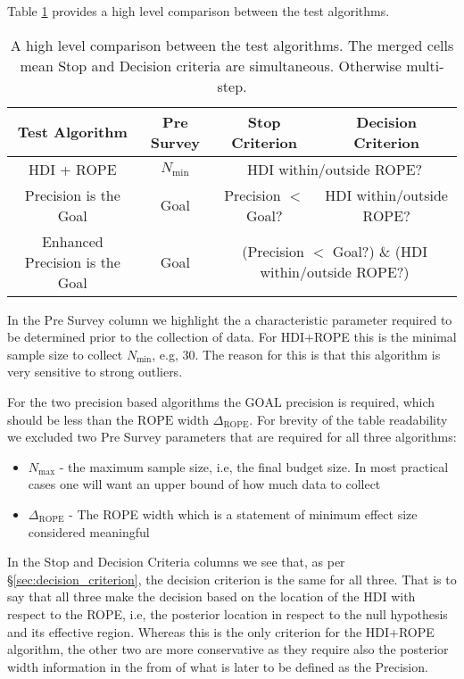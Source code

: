 Table \ref{tab:table1} provides a high level comparison between the test algorithms.


\begin{table}[h!]\label{tab:table1}
    \begin{center}
      \begin{tabular}{c|c|c|c}
        \textbf{Test Algorithm } & \textbf{Pre Survey} & \textbf{Stop Criterion} &  \textbf{Decision Criterion}\\
        \hline
        HDI + ROPE & $N_\mathrm{min}$  & \multicolumn{2}{c}{\multirow{1}{*}{HDI within/outside ROPE?}}  \\
        Precision is the Goal & Goal & Precision $<$ Goal? & HDI within/outside ROPE? \\
        Enhanced Precision is the Goal & Goal& \multicolumn{2}{c}{\multirow{1}{*}{(Precision $<$ Goal?) \& (HDI within/outside ROPE?)}}  \\
      \end{tabular}
      \caption{A high level comparison between the test algorithms.
      The merged cells mean Stop and Decision criteria are simultaneous.
      Otherwise multi-step.
      }
    \end{center}
  \end{table}

In the Pre Survey column we highlight the a characteristic parameter required to be
determined prior to the collection of data. For HDI+ROPE this is the minimal sample size
to collect $N_\mathrm{min}$, e.g, 30. The reason for this is that this algorithm
is very sensitive to strong outliers.

For the two precision based algorithms the $\mathrm{GOAL}$ precision is required,
which should be less than the $\mathrm{ROPE}$ width $\Delta_\mathrm{ROPE}$. For brevity of the table
readability we excluded two Pre Survey parameters that are required for all three
algorithms:
\begin{itemize}
    \item $N_\mathrm{max}$ - the maximum sample size, i.e, the final budget size. In most practical cases one will want an upper bound of how much data to collect
    \item $\Delta_\mathrm{ROPE}$ - The ROPE width which is a statement of minimum effect size considered meaningful
\end{itemize}

In the Stop and Decision Criteria columns we see that,
as per \S\ref{sec:decision_criterion}, the decision criterion is the same
for all three. That is to say that all three make the decision based on the
location of the HDI with respect to the ROPE, i.e, the posterior location in respect
to the null hypothesis and its effective region.
Whereas this is the only criterion for the HDI+ROPE algorithm, the other two
are more conservative as they require also the posterior width information in the from
of what is later to be defined as the Precision.


